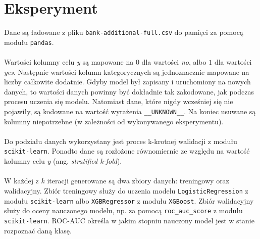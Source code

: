 \documentclass[12pt,a4paper]{article}
\begin{document}
\section*{Eksperyment}
Dane są ładowane z pliku \texttt{bank-additional-full.csv} do pamięci za pomocą modułu \texttt{pandas}.
\\
\\
Wartości kolumny celu \textit{y} są mapowane na $0$ dla wartości \textit{no}, albo $1$ dla wartości \textit{yes}. Następnie wartości kolumn kategorycznych są jednoznacznie mapowane na liczby całkowite dodatnie. Gdyby model był zapisany i uruchomiony na nowych danych, to wartości danych powinny być dokładnie tak zakodowane, jak podczas procesu uczenia się modelu. Natomiast dane, które nigdy wcześniej się nie pojawiły, są kodowane na wartość wyrażenia \texttt{\_\_UNKNOWN\_\_}. Na koniec usuwane są kolumny niepotrzebne (w zależności od wykonywanego eksperymentu).
\\
\\
Do podziału danych wykorzystany jest proces k-krotnej walidacji z modułu \texttt{scikit-learn}. Ponadto dane są rozłożone równomiernie ze względu na wartość kolumny celu \textit{y} (ang. \textit{stratified k-fold}).
\\
\\
W każdej z $k$ iteracji generowane są dwa zbiory danych: treningowy oraz walidacyjny. Zbiór treningowy służy do uczenia modelu \texttt{LogisticRegression} z modułu \texttt{scikit-learn} albo \texttt{XGBRegressor} z modułu \texttt{XGBoost}. Zbiór walidacyjny służy do oceny nauczonego modelu, np. za pomocą \texttt{roc\_auc\_score} z modułu \texttt{scikit-learn}. ROC-AUC określa w jakim stopniu nauczony model jest w stanie rozpoznać daną klasę.
\end{document}
